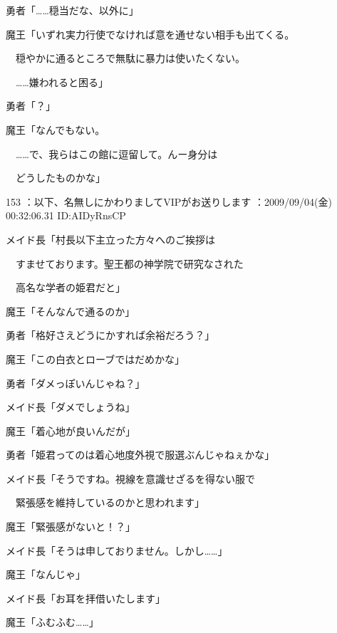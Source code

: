 \documentclass[a4j,twocolumn]{tarticle}
\begin{document}
勇者「……穏当だな、以外に」\par{} 
魔王「いずれ実力行使でなければ意を通せない相手も出てくる。\par{} 
　穏やかに通るところで無駄に暴力は使いたくない。\par{} 
　……嫌われると困る」 



勇者「？」  



魔王「なんでもない。\par{} 
　……で、我らはこの館に逗留して。んー身分は\par{} 
　どうしたものかな」 

	
    
    

153 ：以下、名無しにかわりましてVIPがお送りします ：2009/09/04(金) 00:32:06.31 ID:AIDyRnsCP 


メイド長「村長以下主立った方々へのご挨拶は\par{} 
　すませております。聖王都の神学院で研究なされた\par{} 
　高名な学者の姫君だと」 



魔王「そんなんで通るのか」\par{} 
勇者「格好さえどうにかすれば余裕だろう？」 



魔王「この白衣とローブではだめかな」\par{} 
勇者「ダメっぽいんじゃね？」\par{} 
メイド長「ダメでしょうね」 



魔王「着心地が良いんだが」\par{} 
勇者「姫君ってのは着心地度外視で服選ぶんじゃねぇかな」\par{} 
メイド長「そうですね。視線を意識せざるを得ない服で\par{} 
　緊張感を維持しているのかと思われます」 



魔王「緊張感がないと！？」\par{} 
メイド長「そうは申しておりません。しかし……」 



魔王「なんじゃ」\par{} 
メイド長「お耳を拝借いたします」 



魔王「ふむふむ……」 

	
    
    
\end{document}

